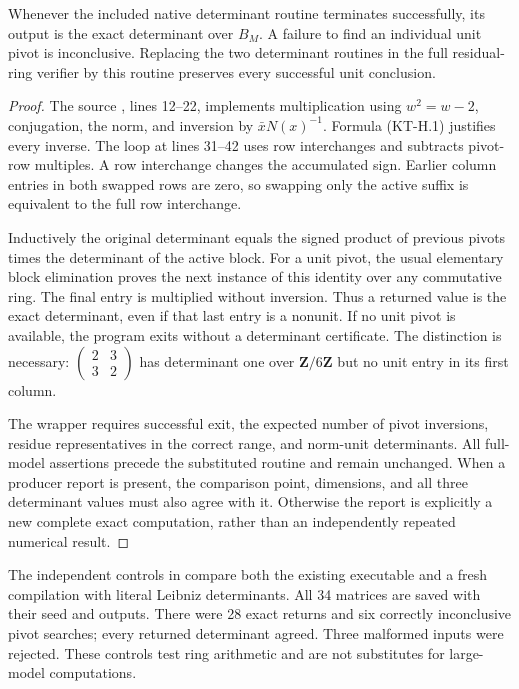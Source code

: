 \begin{lemma}
Whenever the included native determinant routine terminates
successfully, its output is the exact determinant over $B_M$.
A failure to find an individual unit pivot is inconclusive.
Replacing the two determinant routines in the full residual-ring
verifier by this routine preserves every successful unit conclusion.
\end{lemma}
\begin{proof}
The source , lines 12--22,
implements multiplication using $w^2=w-2$, conjugation, the norm,
and inversion by $\bar xN(x)^{-1}$.  Formula (KT-H.1) justifies
every inverse.  The loop at lines 31--42 uses row interchanges and
subtracts pivot-row multiples.  A row interchange changes the
accumulated sign.  Earlier column entries in both swapped rows
are zero, so swapping only the active suffix is equivalent to
the full row interchange.

Inductively the original determinant equals the signed product
of previous pivots times the determinant of the active block.
For a unit pivot, the usual elementary block elimination proves
the next instance of this identity over any commutative ring.
The final entry is multiplied without inversion.  Thus a returned
value is the exact determinant, even if that last entry is a
nonunit.  If no unit pivot is available, the program exits without
a determinant certificate.  The distinction is necessary:
$\left(\begin{smallmatrix}2&3\\3&2\end{smallmatrix}\right)$
has determinant one over $\mathbf Z/6\mathbf Z$ but no unit
entry in its first column.

The wrapper requires successful exit, the expected number of
pivot inversions, residue representatives in the correct range,
and norm-unit determinants.  All full-model assertions precede
the substituted routine and remain unchanged.  When a producer
report is present, the comparison point, dimensions, and all
three determinant values must also agree with it.  Otherwise the
report is explicitly a new complete exact computation, rather
than an independently repeated numerical result.
\end{proof}

The independent controls in 
compare both the existing executable and a fresh compilation with
literal Leibniz determinants.  All 34 matrices are saved with
their seed and outputs.  There were 28 exact returns and six
correctly inconclusive pivot searches; every returned determinant
agreed.  Three malformed inputs were rejected.  These controls
test ring arithmetic and are not substitutes for large-model
computations.

